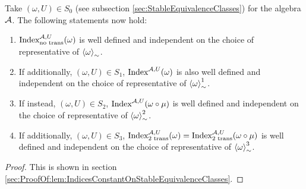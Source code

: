\documentclass[11pt,a4paper,twoside]{article}
\numberwithin{equation}{section}
\begin{document}
	\begin{theorem}\label{lem:IndicesConstantOnStableEquivalenceClasses}
		Take $(\omega,U)\in S_0$ (see subsection \ref{sec:StableEquivalenceClasses}) for the algebra $\AA$. The following statements now hold:
		\begin{enumerate}
			\item $\textrm{Index}^{\AA,U}_{\text{no trans}}(\omega)$ is well defined and independent on the choice of representative of $\expval{\omega}_\sim$.
			\item If additionally, $(\omega,U)\in S_1$, $\textrm{Index}^{\AA,U}(\omega)$ is also well defined and independent on the choice of representative of $\expval{\omega}_\sim^1$.
			\item If instead, $(\omega,U)\in S_2$, $\textrm{Index}^{\AA,U}(\omega\circ\mu)$ is well defined and independent on the choice of representative of $\expval{\omega}_\sim^2$.
			\item If additionally, $(\omega,U)\in S_3$, $\textrm{Index}^{\AA,U}_{\textrm{2 trans}}(\omega)=\textrm{Index}^{\AA,U}_{\textrm{2 trans}}(\omega\circ\mu)$ is well defined and independent on the choice of representative of $\expval{\omega}_\sim^3$.
		\end{enumerate}
	\end{theorem}
	\begin{proof}
		This is shown in section \ref{sec:ProofOf:lem:IndicesConstantOnStableEquivalenceClasses}.
	\end{proof}
\end{document}
